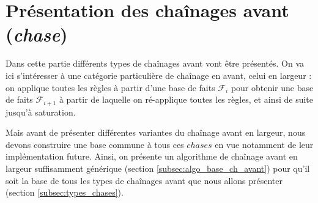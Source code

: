 \section{Présentation des chaînages avant (\textit{chase})}\label{sec:types_de_chases}


Dans cette partie différents types de chaînages avant vont être présentés. On va ici s'intéresser à une catégorie particulière de chaînage en avant, celui en largeur : on applique toutes les règles à partir d'une base de faits $\mathcal{F}_i$ pour obtenir une base de faits $\mathcal{F}_{i+1}$ à partir de laquelle on ré-applique toutes les règles, et ainsi de suite jusqu'à saturation. 
\par Mais avant de présenter différentes variantes du chaînage avant en largeur, nous devons construire une base commune à tous ces $chases$ en vue notamment de leur implémentation future. Ainsi, on présente un algorithme de chaînage avant en largeur suffisamment générique (section \ref{subsec:algo_base_ch_avant}) pour qu'il soit la base de tous les types de chaînages avant  que nous allons présenter  (section \ref{subsec:types_chases}).





